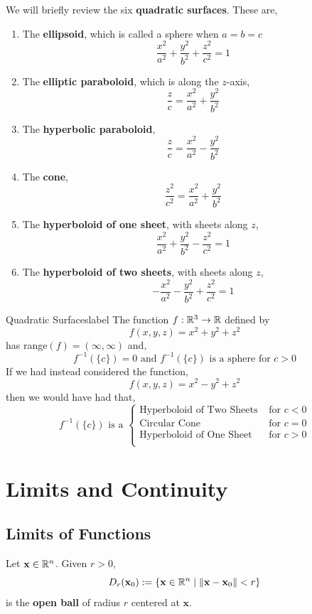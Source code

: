 \begin{rmk}
    We will briefly review the six \textbf{quadratic surfaces}. These are,
    \begin{enumerate}
        \item The \textbf{ellipsoid}, which is called a sphere when $a = b = c$
        \[\frac{x^2}{a^2}+\frac{y^2}{b^2}+\frac{z^2}{c^2}=1\]
        \item The \textbf{elliptic paraboloid}, which is along the $z$-axis,
        \[\frac{z}{c}=\frac{x^2}{a^2}+\frac{y^2}{b^2}\]
        \item The \textbf{hyperbolic paraboloid},
        \[\frac{z}{c}=\frac{x^2}{a^2}-\frac{y^2}{b^2}\]
        \item The \textbf{cone},
        \[\frac{z^2}{c^2}=\frac{x^2}{a^2}+\frac{y^2}{b^2}\]
        \item The \textbf{hyperboloid of one sheet}, with sheets along $z$,
        \[\frac{x^2}{a^2}+\frac{y^2}{b^2}-\frac{z^2}{c^2}=1\]
        \item The \textbf{hyperboloid of two sheets}, with sheets along $z$,
        \[-\frac{x^2}{a^2}-\frac{y^2}{b^2}+\frac{z^2}{c^2}=1\]
    \end{enumerate}
\end{rmk}

\begin{ex}{Quadratic Surfaces}{label}
    The function $f: \mathbb{R}^3 \rightarrow \mathbb{R}$ defined by
\[f(x, y, z) = x^2 + y^2 + z^2\]
has range$(f) = (\infty, \infty)$ and,
\[f^{-1}(\{c\}) = 0 \text{ and } f^{-1}(\{c\}) \text{ is a sphere for } c > 0\]
If we had instead considered the function,
\[f(x, y, z)=x^2-y^2+z^2\]
then we would have had that,
\[
f^{-1}(\{c\}) \text{ is a } \begin{cases}
                \text{Hyperboloid of Two Sheets} & \text{ for } c < 0 \\
                \text{Circular Cone} & \text{ for } c = 0 \\
                \text{Hyperboloid of One Sheet} & \text{ for } c > 0 \\
                \end{cases}
\]
\end{ex}

\section{Limits and Continuity}
\subsection{Limits of Functions}
\begin{defn}
     Let $\mathbf{x} \in \mathbb{R}^n$. Given $r > 0$,
     \[D_r(\mathbf{x}_0) := \{\mathbf{x} \in \mathbb{R}^n \mid \|\mathbf{x} - \mathbf{x}_0\| < r\}\]
     is the \textbf{open ball} of radius $r$ centered at $\mathbf{x}$.
\end{defn}

